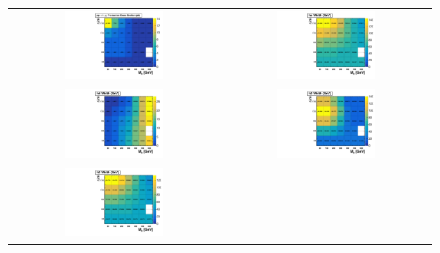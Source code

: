 \begin{figure}[htb]
  \begin{tabular}{cc}
\includegraphics[width=0.49\textwidth]{2HDM/varysinp/MH750_MA500_MDM1/2HDMPZ2_xsec_varysinp.pdf} &
\includegraphics[width=0.49\textwidth]{2HDM/varysinp/MH750_MA500_MDM1/2HDMPZ2_hcwidth_varysinp.pdf} \\
\includegraphics[width=0.49\textwidth]{2HDM/varysinp/MH750_MA500_MDM1/2HDMPZ2_h4width_varysinp.pdf} &
\includegraphics[width=0.49\textwidth]{2HDM/varysinp/MH750_MA500_MDM1/2HDMPZ2_h3width_varysinp.pdf} \\
\includegraphics[width=0.49\textwidth]{2HDM/varysinp/MH750_MA500_MDM1/2HDMPZ2_h2width_varysinp.pdf} &

\end{tabular}
\end{figure}
